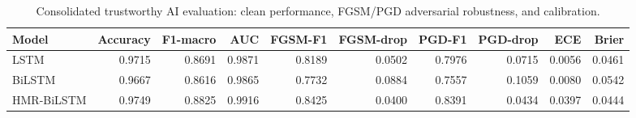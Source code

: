 \begin{table}[h!]
\centering
\caption{Consolidated trustworthy AI evaluation: clean performance, FGSM/PGD adversarial robustness, and calibration.}
\label{tab:consolidated}
\begin{tabular}{lrrrrrrrrr}
\toprule
Model & Accuracy & F1-macro & AUC & FGSM-F1 & FGSM-drop & PGD-F1 & PGD-drop & ECE & Brier \\
\midrule
LSTM & 0.9715 & 0.8691 & 0.9871 & 0.8189 & 0.0502 & 0.7976 & 0.0715 & 0.0056 & 0.0461 \\
BiLSTM & 0.9667 & 0.8616 & 0.9865 & 0.7732 & 0.0884 & 0.7557 & 0.1059 & 0.0080 & 0.0542 \\
HMR-BiLSTM & 0.9749 & 0.8825 & 0.9916 & 0.8425 & 0.0400 & 0.8391 & 0.0434 & 0.0397 & 0.0444 \\
\bottomrule
\end{tabular}
\end{table}